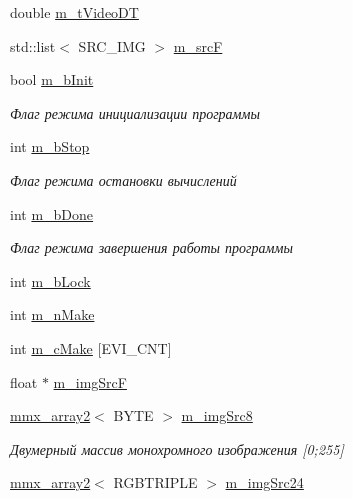 \begin{DoxyCompactItemize}
\item 
double \hyperlink{class_c_v_i_engine_base_a0bbf6f3d2d6b80fec8d223ffb44a6791}{m\+\_\+t\+Video\+D\+T}
\item 
std\+::list$<$ S\+R\+C\+\_\+\+I\+M\+G $>$ \hyperlink{class_c_v_i_engine_base_a67a15f389d32a0201997a71dc4695803}{m\+\_\+src\+F}
\item 
bool \hyperlink{class_c_v_i_engine_base_a775fea6c14d39ec6989306017f4f1c9e}{m\+\_\+b\+Init}
\begin{DoxyCompactList}\small\item\em Флаг режима инициализации программы \end{DoxyCompactList}\item 
int \hyperlink{class_c_v_i_engine_base_a13cd33209e328eed98e79086439748b2}{m\+\_\+b\+Stop}
\begin{DoxyCompactList}\small\item\em Флаг режима остановки вычислений \end{DoxyCompactList}\item 
int \hyperlink{class_c_v_i_engine_base_aa780c31b49f591af32d9a40e21978201}{m\+\_\+b\+Done}
\begin{DoxyCompactList}\small\item\em Флаг режима завершения работы программы \end{DoxyCompactList}\item 
int \hyperlink{class_c_v_i_engine_base_aa909c6b38f749c7b4d848f8b2de331bc}{m\+\_\+b\+Lock}
\item 
int \hyperlink{class_c_v_i_engine_base_a4f173a318d25c068952f2c68f4248208}{m\+\_\+n\+Make}
\item 
int \hyperlink{class_c_v_i_engine_base_a2c62f336b24d613e0320d2e6f676b89b}{m\+\_\+c\+Make} \mbox{[}E\+V\+I\+\_\+\+C\+N\+T\mbox{]}
\item 
float $\ast$ \hyperlink{class_c_v_i_engine_base_a359f07597366b8c81727c32c9ff931be}{m\+\_\+img\+Src\+F}
\item 
\hyperlink{classmmx__array2}{mmx\+\_\+array2}$<$ B\+Y\+T\+E $>$ \hyperlink{class_c_v_i_engine_base_aa935595a167539c89a4d06a57178d776}{m\+\_\+img\+Src8}
\begin{DoxyCompactList}\small\item\em Двумерный массив монохромного изображения \mbox{[}0;255\mbox{]} \end{DoxyCompactList}\item 
\hyperlink{classmmx__array2}{mmx\+\_\+array2}$<$ R\+G\+B\+T\+R\+I\+P\+L\+E $>$ \hyperlink{class_c_v_i_engine_base_a252e6e1285e6063718c7d7a874298363}{m\+\_\+img\+Src24}

\end{DoxyCompactItemize}

